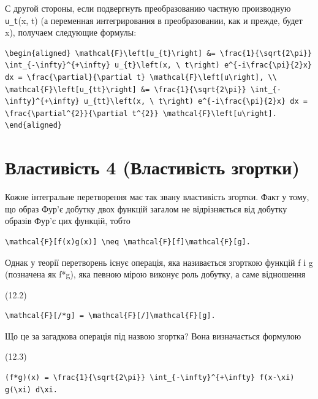 \documentclass[
  ukrainian,
]{article}
\begin{document}
С другой стороны, если подвергнуть преобразованию частную производную
\texttt{u\_t}(x, t) (а переменная интегрирования в преобразовании, как и
прежде, будет x), получаем следующие формулы:

\begin{verbatim}
\begin{aligned} \mathcal{F}\left[u_{t}\right] &= \frac{1}{\sqrt{2\pi}} \int_{-\infty}^{+\infty} u_{t}\left(x, \ t\right) e^{-i\frac{\pi}{2}x} dx = \frac{\partial}{\partial t} \mathcal{F}\left[u\right], \\ \mathcal{F}\left[u_{tt}\right] &= \frac{1}{\sqrt{2\pi}} \int_{-\infty}^{+\infty} u_{tt}\left(x, \ t\right) e^{-i\frac{\pi}{2}x} dx = \frac{\partial^{2}}{\partial t^{2}} \mathcal{F}\left[u\right]. \end{aligned}
\end{verbatim}

\section{Властивість 4 (Властивість
згортки)}\label{ux432ux43bux430ux441ux442ux438ux432ux456ux441ux442ux44c-4-ux432ux43bux430ux441ux442ux438ux432ux456ux441ux442ux44c-ux437ux433ux43eux440ux442ux43aux438}

Кожне інтегральне перетворення має так звану властивість згортки. Факт у
тому, що образ Фур'є добутку двох функцій загалом не відрізняється від
добутку образів Фур'є цих функцій, тобто

\begin{verbatim}
\mathcal{F}[f(x)g(x)] \neq \mathcal{F}[f]\mathcal{F}[g].
\end{verbatim}

Однак у теорії перетворень існує операція, яка називається згорткою
функцій f і g (позначена як f*g), яка певною мірою виконує роль добутку,
а саме відношення

(12.2)

\begin{verbatim}
\mathcal{F}[/*g] = \mathcal{F}[/]\mathcal{F}[g].
\end{verbatim}

Що це за загадкова операція під назвою згортка? Вона визначається
формулою

(12.3)

\begin{verbatim}
(f*g)(x) = \frac{1}{\sqrt{2\pi}} \int_{-\infty}^{+\infty} f(x-\xi) g(\xi) d\xi.
\end{verbatim}
\end{document}
